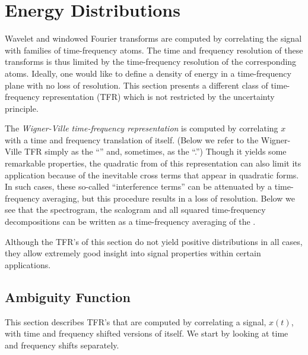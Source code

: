 \section{Energy Distributions}
\label{sec:energy}
Wavelet and windowed Fourier transforms are computed by
correlating the signal with families of time-frequency atoms.  The
time and frequency resolution of these transforms is thus limited by
the time-frequency resolution of the corresponding atoms.  Ideally,
one would like to define a density of energy in a time-frequency
plane with no loss of resolution.  This section presents a
different class of time-frequency representation (TFR) which is not
restricted by the uncertainty principle.  

The \emph{Wigner-Ville time-frequency representation} is computed by
correlating $x$ with a time and frequency translation of itself.
(Below we refer to the Wigner-Ville TFR simply as the ``\WV'' and,
sometimes, as the ``\WT.'')  Though it yields some remarkable
properties, the quadratic from of this representation can also limit
its application because of the inevitable cross terms that appear in 
quadratic forms.  In such cases, these so-called ``interference
terms'' can be attenuated by a time-frequency averaging, but this
procedure results in a loss of resolution. Below we see that the
spectrogram, the scalogram and all squared time-frequency
decompositions can be written as a time-frequency averaging of the
\WT. 

Although the TFR's of this section do not yield positive
distributions in all cases, they allow extremely good insight into
signal properties within certain applications.  

{\subsection{Ambiguity Function\protect\footnotemark}
}
\label{sec:ambig-funct}
This section describes TFR's that are computed by correlating a signal,
$x(t)$, with time and frequency shifted versions of itself.  We start
by looking at time and frequency shifts separately.

